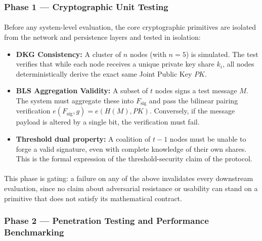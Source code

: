 \documentclass[a4paper]{scl-article}
\begin{document}
\subsubsection{Phase 1 --- Cryptographic Unit Testing}
\label{sect:meth4_b}
\paragraph{}Before any system-level evaluation, the core cryptographic primitives are isolated from the network and persistence layers and tested in isolation:
\begin{itemize}
    \item \textbf{DKG Consistency:} A cluster of $n$ nodes (with $n = 5$) is simulated. The test verifies that while each node receives a unique private key share $k_i$, all nodes deterministically derive the exact same Joint Public Key $PK$.
    \item \textbf{BLS Aggregation Validity:} A subset of $t$ nodes signs a test message $M$. The system must aggregate these into $F_{\text{sig}}$ and pass the bilinear pairing verification $e(F_{\text{sig}}, g) = e(H(M), PK)$. Conversely, if the message payload is altered by a single bit, the verification must fail.
    \item \textbf{Threshold dual property:} A coalition of $t - 1$ nodes must be unable to forge a valid signature, even with complete knowledge of their own shares. This is the formal expression of the threshold-security claim of the protocol.
\end{itemize}
\paragraph{}This phase is gating: a failure on any of the above invalidates every downstream evaluation, since no claim about adversarial resistance or usability can stand on a primitive that does not satisfy its mathematical contract.

\subsubsection{Phase 2 --- Penetration Testing and Performance Benchmarking}
\label{sect:meth4_c}
\end{document}
